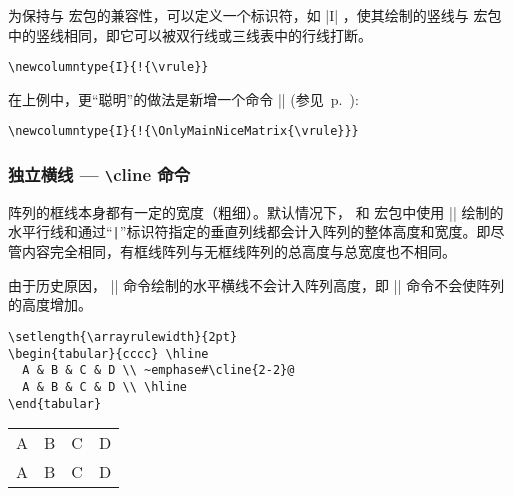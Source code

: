 \documentclass[dvipsnames]{article}%
\begin{document}
\bigskip
为保持与  宏包的兼容性，可以定义一个标识符，如 |I| ，使其绘制的竖线与  宏包中的竖线相同，即它可以被双行线或三线表中的行线打断。

\begin{Verbatim}
\newcolumntype{I}{!{\vrule}}
\end{Verbatim}

在上例中，更“聪明”的做法是新增一个命令 |\OnlyMainNiceMatrix| (参见~p.~\pageref{OnlyMainNiceMatrix}):
\begin{Verbatim}
\newcolumntype{I}{!{\OnlyMainNiceMatrix{\vrule}}}
\end{Verbatim}


\bigskip
\subsubsection{独立横线 --- \texttt{\textbackslash}cline 命令}
\label{remark-cline}


阵列的框线本身都有一定的宽度（粗细）。默认情况下，  和  宏包中使用 |\hline| 绘制的水平行线和通过``\verb+|+''标识符指定的垂直列线都会计入阵列的整体高度和宽度。即尽管内容完全相同，有框线阵列与无框线阵列的总高度与总宽度也不相同。

\smallskip
由于历史原因， |\cline| 命令绘制的水平横线不会计入阵列高度，即 |\cline| 命令不会使阵列的高度增加。

\medskip
\begin{BVerbatim}[baseline=c,boxwidth=10cm]
\setlength{\arrayrulewidth}{2pt}
\begin{tabular}{cccc} \hline
  A & B & C & D \\ ~emphase#\cline{2-2}@
  A & B & C & D \\ \hline
\end{tabular}
\end{BVerbatim}
\begin{scope}
\setlength{\arrayrulewidth}{2pt}
\begin{tabular}[c]{cccc}
\hline
A & B & C & D \\
\cline{2-2}
A & B & C &D \\
\hline
\end{tabular}
\end{scope}
\end{document}

